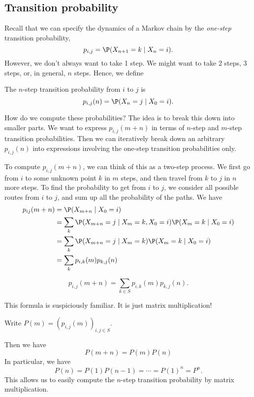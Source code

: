 \documentclass[a4paper]{article}
\begin{document}
\subsection{Transition probability}
Recall that we can specify the dynamics of a Markov chain by the \emph{one-step} transition probability,
\[
  p_{i, j} = \P(X_{n + 1} = k\mid X_n = i).
\]
However, we don't always want to take 1 step. We might want to take 2 steps, 3 steps, or, in general, $n$ steps. Hence, we define
\begin{defi}
  The $n$-step transition probability from $i$ to $j$ is
  \[
    p_{i, j}(n) = \P(X_n = j\mid X_0 = i).
  \]
\end{defi}
How do we compute these probabilities? The idea is to break this down into smaller parts. We want to express $p_{i, j}(m + n)$ in terms of $n$-step and $m$-step transition probabilities. Then we can iteratively break down an arbitrary $p_{i, j}(n)$ into expressions involving the one-step transition probabilities only.

To compute $p_{i, j}(m + n)$, we can think of this as a two-step process. We first go from $i$ to some unknown point $k$ in $m$ steps, and then travel from $k$ to $j$ in $n$ more steps. To find the probability to get from $i$ to $j$, we consider all possible routes from $i$ to $j$, and sum up all the probability of the paths. We have
\begin{align*}
  p_{ij}(m + n) &= \P(X_{m + n}\mid X_0 = i)\\
  &= \sum_k \P(X_{m + n} = j\mid X_m = k, X_0 = i)\P(X_m = k\mid X_0 = i)\\
  &= \sum_k \P(X_{m + n} = j\mid X_m = k)\P(X_m = k \mid X_0 = i)\\
  &= \sum_k p_{i, k}(m)p_{k, j}(n)
\end{align*}
\begin{thm}
  \[
    p_{i, j}(m + n) = \sum_{k\in S} p_{i, k}(m) p_{k, j}(n).
  \]
\end{thm}
This formula is suspiciously familiar. It is just matrix multiplication!

\begin{notation}
  Write $P(m) = (p_{i, j}(m))_{i, j\in S}$.
\end{notation}
Then we have
\[
  P(m + n) = P(m)P(n)
\]
In particular, we have
\[
  P(n) = P(1)P(n - 1) = \cdots = P(1)^n = P^n.
\]
This allows us to easily compute the $n$-step transition probability by matrix multiplication.
\end{document}
